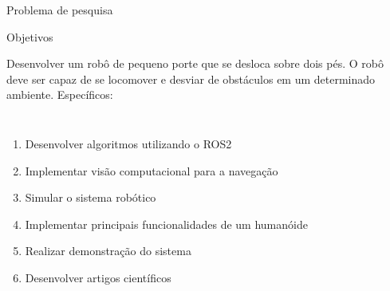 \begin{frame}[c]{Problema de pesquisa} 
    \transdissolve[duration=0.5]
   
    \begin{center}
    \end{center}
    
   
\end{frame}
\begin{frame}[t]{Objetivos} 
    \transdissolve[duration=0.5]
    
        Desenvolver um robô de pequeno porte que se desloca sobre dois pés. O robô deve ser capaz de se locomover e desviar de obstáculos em um determinado ambiente.
        \newline
        \newline
         Específicos:
        \begin{columns}[t]
                \begin{enumerate}
                    \item Desenvolver algoritmos utilizando o ROS2
                    \item Implementar visão computacional para a navegação
                    \item Simular o sistema robótico
                    \item Implementar principais funcionalidades de um humanóide
                    \item Realizar demonstração do sistema
                    \item Desenvolver artigos científicos
                \end{enumerate}
        \end{columns}
\end{frame}
